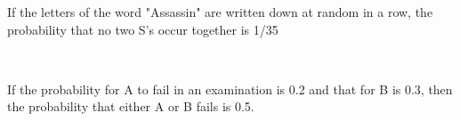 
\iffalse
  \title{PROBABILITY}
  \author{J.KEDARANANDA}
  \section{true-false}
\fi
    \item If the letters of the word "Assassin" are written down at random in a row, the probability that no two S's occur together is 1/35
    
    \hfill{}\\
    \item If the probability for A to fail in an examination is 0.2 and that for B is 0.3, then the probability that either A or B fails is 0.5.
    
    \hfill{}
